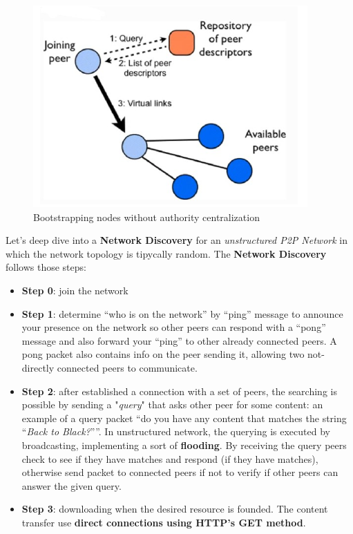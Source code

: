 \documentclass[10pt,a4paper]{report}
\begin{document}
\begin{figure}[h!]
	\centering
	\includegraphics[scale=0.70]{images/Pasted image 20230224154330.png}
	\caption{Bootstrapping nodes without authority centralization}
	\label{gnutella-p2p}
\end{figure}

Let's deep dive into a \textbf{Network Discovery}  for an \textit{unstructured P2P Network} in which the network topology is tipycally random. The \textbf{Network Discovery} follows those steps:
\begin{itemize}
	\item 
	\textbf{Step 0}: join the network
	\item 
	\textbf{Step 1}: determine “who is on the network” by “ping” message to announce your presence on the network so other peers can respond with a “pong” message and also forward your “ping” to other already connected peers. A pong packet also contains info on the peer sending it, allowing two not-directly connected peers to communicate.
	\item 
	\textbf{Step 2}: after established a connection with a set of peers, the searching is possible by sending a  "\textit{query}"  that asks other peer for some content: an example of a query packet “do you have any content that matches the string “\textit{Back to Black?}””. In unstructured network, the querying is executed by broadcasting, implementing a sort of \textbf{flooding}. By receiving the query peers check to see if they have matches and respond (if they have matches), otherwise send packet to connected peers if not to verify if other peers can answer the given query.
	\item 
	\textbf{Step 3}: downloading when the desired resource is founded. The content transfer use \textbf{direct connections using HTTP's GET method}.
\end{itemize}
\end{document}

